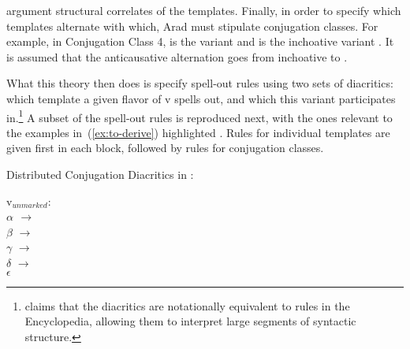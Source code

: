 \begin{exe}
\begin{xlist}
\begin{xlist}
\begin{exe}
\begin{xlist}
\begin{xlist}
\begin{exe}
\begin{xlist}
\begin{xlist}
\begin{exe}
\begin{exe}
\begin{xlist}
\begin{exe}
\begin{exe}
\begin{xlist}
\begin{exe}
\begin{exe}
\begin{exe}
\begin{exe}
\begin{exe}
\begin{xlist}
\begin{exe}
\begin{xlist}
\begin{exe}
\begin{exe}
\begin{xlist}
\begin{exe}
\begin{xlist}
\begin{exe}
\begin{exe}
\begin{exe}
\begin{xlist}
\begin{exe}
\begin{exe}
\begin{exe}
\begin{xlist}
\begin{exe}
\begin{xlist}
\begin{exe}
\begin{xlist}
\begin{exe}
\begin{xlist}
\begin{exe}
\begin{exe}
\begin{exe}
\begin{exe}
\begin{xlist}
\begin{exe}
\begin{xlist}
\begin{exe}
\begin{xlist}
\begin{exe}
\begin{xlist}
\begin{exe}
\begin{xlist}
\begin{exe}
\begin{xlist}
\begin{exe}
\begin{exe}
\begin{exe}
\begin{exe}
\begin{xlist}
\begin{exe}
\begin{xlist}
\begin{exe}
\begin{xlist}
\begin{exe}
\begin{exe}
\begin{xlist}
\begin{exe}
\begin{exe}
\begin{exe}
\begin{exe}
\begin{xlist}
\begin{xlist}
\begin{exe}
\begin{xlist}
\begin{exe}
\begin{exe}
\begin{exe}
\begin{xlist}
\begin{exe}
\begin{exe}
\begin{xlist}
\begin{exe}
\begin{exe}
\begin{exe}
\begin{xlist}
\begin{xlist}
\begin{exe}
\begin{xlist}
\begin{exe}
\begin{exe}
\begin{exe}
\begin{exe}
\begin{xlist}
\begin{exe}
\begin{xlist}
\begin{exe}
\begin{xlist}
\begin{exe}
\begin{exe}
\begin{exe}
\begin{exe}
\begin{exe}
\begin{exe}
\begin{xlist}
\begin{exe}
\begin{xlist}
\begin{exe}
\begin{xlist}
\begin{exe}
\begin{xlist}
\begin{exe}
\begin{xlist}
\begin{exe}
\begin{xlist}
argument structural correlates of the templates. Finally, in order to specify which templates alternate with which, Arad must stipulate conjugation classes. For example, in Conjugation Class 4, {\tpie} is the  variant and {\thit} is the inchoative variant \citep[220]{arad05}. It is assumed that the anticausative alternation goes from inchoative to .
		
What this theory then does is specify spell-out rules using two sets of diacritics: which template a given flavor of v spells out, and which  this variant participates in.\footnote{\citet[227ff41]{arad05} claims that the diacritics are notationally equivalent to rules in the Encyclopedia, allowing them to interpret large segments of syntactic structure.} A subset of the spell-out rules is reproduced next, with the ones relevant to the examples in~(\ref{ex:to-derive}) highlighted \citep[230--231]{arad05}. Rules for individual templates are given first in each block, followed by rules for conjugation classes.

 \begin{exe}
 \ex  Distributed Conjugation Diacritics in \cite{arad05}: \label{ex:arad-classes} 
 \begin{xlist} 
\begin{multicols}{2}
 	\ex   v$_{unmarked}$: \\
			\textbf{$ \alpha$ $\rightarrow$ {\tkal}} \\
			$\beta$ $\rightarrow$ {\tnif}\\
			$\gamma$ $\rightarrow$ {\tpie}\\
			$\delta$ $\rightarrow$ {\thif}\\
			$\epsilon$ 
\end{multicols}
\end{xlist}
\end{exe}
\end{xlist}
\end{exe}
\end{xlist}
\end{exe}
\end{xlist}
\end{exe}
\end{xlist}
\end{exe}
\end{xlist}
\end{exe}
\end{xlist}
\end{exe}
\end{exe}
\end{exe}
\end{exe}
\end{exe}
\end{exe}
\end{xlist}
\end{exe}
\end{xlist}
\end{exe}
\end{xlist}
\end{exe}
\end{exe}
\end{exe}
\end{exe}
\end{xlist}
\end{exe}
\end{xlist}
\end{xlist}
\end{exe}
\end{exe}
\end{exe}
\end{xlist}
\end{exe}
\end{exe}
\end{xlist}
\end{exe}
\end{exe}
\end{exe}
\end{xlist}
\end{exe}
\end{xlist}
\end{xlist}
\end{exe}
\end{exe}
\end{exe}
\end{exe}
\end{xlist}
\end{exe}
\end{exe}
\end{xlist}
\end{exe}
\end{xlist}
\end{exe}
\end{xlist}
\end{exe}
\end{exe}
\end{exe}
\end{exe}
\end{xlist}
\end{exe}
\end{xlist}
\end{exe}
\end{xlist}
\end{exe}
\end{xlist}
\end{exe}
\end{xlist}
\end{exe}
\end{xlist}
\end{exe}
\end{exe}
\end{exe}
\end{exe}
\end{xlist}
\end{exe}
\end{xlist}
\end{exe}
\end{xlist}
\end{exe}
\end{xlist}
\end{exe}
\end{exe}
\end{exe}
\end{xlist}
\end{exe}
\end{exe}
\end{exe}
\end{xlist}
\end{exe}
\end{xlist}
\end{exe}
\end{exe}
\end{xlist}
\end{exe}
\end{xlist}
\end{exe}
\end{exe}
\end{exe}
\end{exe}
\end{exe}
\end{xlist}
\end{exe}
\end{exe}
\end{xlist}
\end{exe}
\end{exe}
\end{xlist}
\end{xlist}
\end{exe}
\end{xlist}
\end{xlist}
\end{exe}
\end{xlist}
\end{xlist}
\end{exe}
